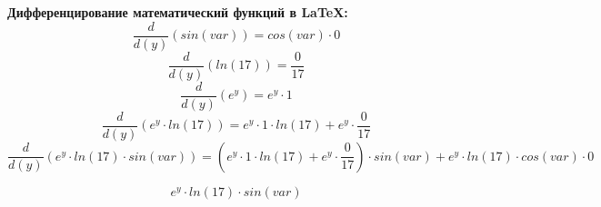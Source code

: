 \documentclass[12pt, letterpaper]{article}
\begin{document}
\textbf{Дифференцирование математический функций в LaTeX:}
\newline
\newline
\[ \frac{ d }{ d(y) }( sin  \left(  var  \right) ) = cos  \left(  var  \right) \cdot  0  \]
 \[ \frac{ d }{ d(y) }( ln \left(  17  \right) ) = \frac{ 0 }{ 17 } \]
 \[ \frac{ d }{ d(y) }( e^{ y }) = e^{ y }\cdot  1  \]
 \[ \frac{ d }{ d(y) }( e^{ y }\cdot ln \left(  17  \right) ) = e^{ y }\cdot  1 \cdot ln \left(  17  \right) +e^{ y }\cdot \frac{ 0 }{ 17 } \]
 \[ \frac{ d }{ d(y) }( e^{ y }\cdot ln \left(  17  \right) \cdot sin  \left(  var  \right) ) = \left(e^{ y }\cdot  1 \cdot ln \left(  17  \right) +e^{ y }\cdot \frac{ 0 }{ 17 }\right)\cdot sin  \left(  var  \right) +e^{ y }\cdot ln \left(  17  \right) \cdot cos  \left(  var  \right) \cdot  0  \]
 
\[ e^{ y }\cdot ln \left(  17  \right) \cdot sin  \left(  var  \right)  \]
\end{document}
